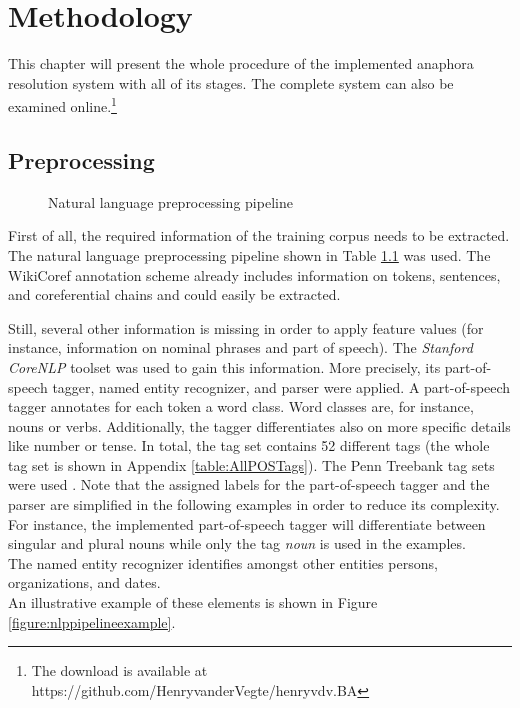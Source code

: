 \chapter{Methodology}
\label{sec:Methodology}
This chapter will present the whole procedure of the implemented anaphora resolution system with all of its stages. The complete system can also be examined online.\footnote{The download is available at https://github.com/HenryvanderVegte/henryvdv.BA}

\section{Preprocessing}
\label{preprocessingSection}
\begin{figure}[h]
	\centering

	\caption{Natural language preprocessing pipeline}
	\label{figure:nlppipeline}
\end{figure}

First of all, the required information of the training corpus needs to be extracted. The natural language preprocessing pipeline shown in Table \ref{figure:nlppipeline} was used.  The WikiCoref annotation scheme already includes information on tokens, sentences, and coreferential chains and could easily be extracted.

Still, several other information is missing in order to apply feature values (for instance, information on nominal phrases and part of speech). The \textit{Stanford CoreNLP} toolset \citep{manning-EtAl:2014:P14-5} was used to gain this information. More precisely, its part-of-speech tagger, named entity recognizer, and parser were applied. 
A part-of-speech tagger annotates for each token a word class. Word classes are, for instance, nouns or verbs. Additionally, the tagger differentiates also on more specific details like number or tense. In total, the tag set contains 52 different tags (the whole tag set is shown in Appendix \ref{table:AllPOSTags}). The Penn Treebank tag sets were used \citep{marcus1993building}. Note that the assigned labels for the part-of-speech tagger and the parser are simplified in the following examples in order to reduce its complexity. For instance, the implemented part-of-speech tagger will differentiate between singular and plural nouns while only the tag \textit{noun} is used in the examples.\\
The named entity recognizer identifies amongst other entities persons, organizations, and dates. \\
An illustrative example of these elements is shown in Figure \ref{figure:nlppipelineexample}. 

